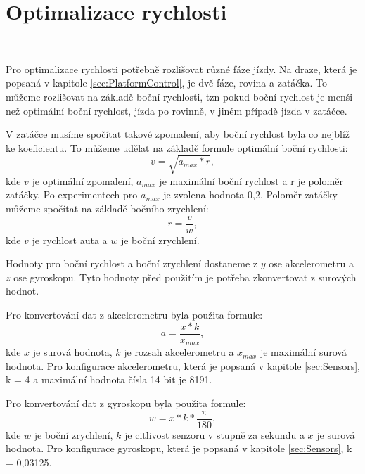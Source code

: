 \chapter{Optimalizace rychlosti}
\label{sec:SpeedOptimization}
\vspace{-20pt}
\

Pro optimalizace rychlosti potřebně rozlišovat různé fáze jízdy.
Na draze, která je popsaná v kapitole \ref{sec:PlatformControl},
je dvě fáze, rovina a zatáčka. To můžeme rozlišovat na základě
boční rychlosti, tzn pokud boční rychlost je menši než optimální boční rychlost,
jízda po rovinně, v jiném případě jízda v zatáčce.

V zatáčce musíme spočítat takové zpomalení, aby boční rychlost byla co nejblíž
ke koeficientu. To můžeme udělat na základě formule optimální boční rychlosti:
\begin{equation}
v = \sqrt{a_{max} * r},
\end{equation}
kde $v$ je optimální zpomalení, $a_{max}$ je maximální boční rychlost a r je
poloměr zatáčky. Po experimentech pro $a_{max}$ je zvolena hodnota 0,2. Poloměr zatáčky můžeme spočítat na základě bočního zrychlení:
\begin{equation}
r = \frac{v}{w},
\end{equation}
kde $v$ je rychlost auta a $w$ je boční zrychlení.

Hodnoty pro boční rychlost a boční zrychlení dostaneme z $y$ ose akcelerometru
a $z$ ose gyroskopu. Tyto hodnoty před použitím je potřeba zkonvertovat z
surových hodnot.

Pro konvertování dat z akcelerometru byla použita formule:
\begin{equation}
a = \frac{x * k}{x_{max}},
\end{equation}
kde $x$ je surová hodnota, $k$ je rozsah akcelerometru a $x_{max}$ je maximální surová hodnota. Pro konfigurace akcelerometru, která je popsaná v kapitole \ref{sec:Sensors},
k = 4 a maximální hodnota čísla 14 bit je 8191.

Pro konvertování dat z gyroskopu byla použita formule:
\begin{equation}
w = x * k * \frac{\pi}{180},
\end{equation}
kde $w$ je boční zrychlení, $k$ je citlivost senzoru v stupně za sekundu a $x$
je surová hodnota. Pro konfigurace gyroskopu, která je popsaná
v kapitole \ref{sec:Sensors}, k = 0,03125.

\endinput
